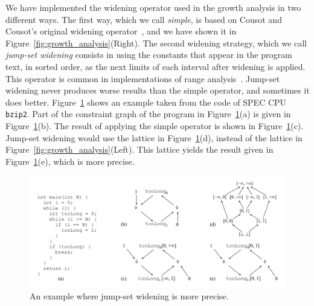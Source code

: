\documentclass[times]{speauth}
\begin{document}
We have implemented the widening operator used in the growth analysis in
two different ways.
The first way, which we call {\em simple}, is based on Cousot and
Cousot's original widening operator~\cite{Cousot77}, and we have shown it
in Figure~\ref{fig:growth_analysis}(Right).
The second widening strategy, which we call {\em jump-set widening} consists
in using the constants that appear in the program text, in sorted order, as
the next limits of each interval after widening is applied.
This operator is common in implementations of range
analysis~\cite[p.228]{Nielson99}.
Jump-set widening never produces worse results than the simple operator, and
sometimes it does better.
Figure~\ref{fig:jumpSet} shows an example taken from the code of
SPEC CPU \texttt{bzip2}.
Part of the constraint graph of the program in Figure~\ref{fig:jumpSet}(a)
is given in Figure~\ref{fig:jumpSet}(b).
The result of applying the simple operator is shown in
Figure~\ref{fig:jumpSet}(c).
Jump-set widening would use the lattice in Figure~\ref{fig:jumpSet}(d),
instead of the lattice in Figure~\ref{fig:growth_analysis}(Left).
This lattice yields the result given in Figure~\ref{fig:jumpSet}(e),
which is more precise.

\begin{figure}[t!]
\begin{center}
\includegraphics[width=1\textwidth]{images/jumpSet}
\end{center}
\caption{\label{fig:jumpSet}
An example where jump-set widening is more precise.}
\end{figure}
\end{document}
